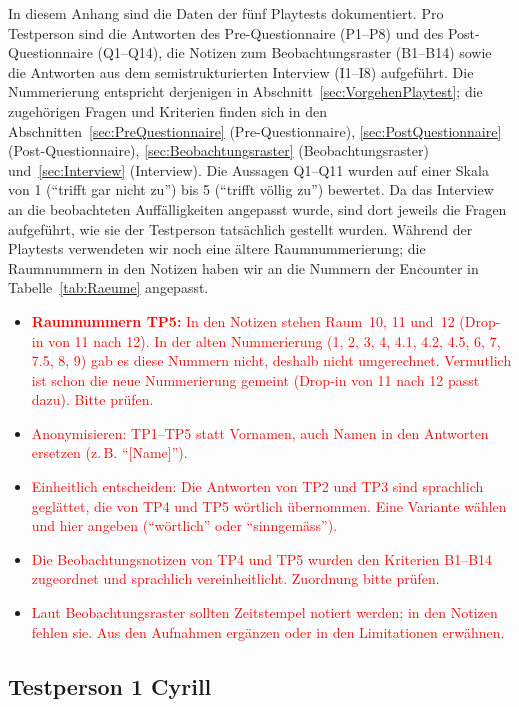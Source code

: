 \documentclass[../Main.tex]{subfiles}
\begin{document}
In diesem Anhang sind die Daten der fünf Playtests dokumentiert. Pro Testperson sind die Antworten des Pre-Questionnaire (P1--P8) und des Post-Questionnaire (Q1--Q14), die Notizen zum Beobachtungsraster (B1--B14) sowie die Antworten aus dem semistrukturierten Interview (I1--I8) aufgeführt. Die Nummerierung entspricht derjenigen in Abschnitt~\ref{sec:VorgehenPlaytest}; die zugehörigen Fragen und Kriterien finden sich in den Abschnitten~\ref{sec:PreQuestionnaire} (Pre-Questionnaire), \ref{sec:PostQuestionnaire} (Post-Questionnaire), \ref{sec:Beobachtungsraster} (Beobachtungsraster) und~\ref{sec:Interview} (Interview). Die Aussagen Q1--Q11 wurden auf einer Skala von 1 (\enquote{trifft gar nicht zu}) bis 5 (\enquote{trifft völlig zu}) bewertet. Da das Interview an die beobachteten Auffälligkeiten angepasst wurde, sind dort jeweils die Fragen aufgeführt, wie sie der Testperson tatsächlich gestellt wurden. Während der Playtests verwendeten wir noch eine ältere Raumnummerierung; die Raumnummern in den Notizen haben wir an die Nummern der Encounter in Tabelle~\ref{tab:Raeume} angepasst.

\begin{itemize}[leftmargin=1.5cm]
    \item \textcolor{red}{\textbf{Raumnummern TP5:} In den Notizen stehen Raum~10, 11 und~12 (Drop-in von 11 nach 12). In der alten Nummerierung (1, 2, 3, 4, 4.1, 4.2, 4.5, 6, 7, 7.5, 8, 9) gab es diese Nummern nicht, deshalb nicht umgerechnet. Vermutlich ist schon die neue Nummerierung gemeint (Drop-in von 11 nach 12 passt dazu). Bitte prüfen.}
    \item \textcolor{red}{Anonymisieren: TP1--TP5 statt Vornamen, auch Namen in den Antworten ersetzen (z.\,B. \enquote{[Name]}).}
    \item \textcolor{red}{Einheitlich entscheiden: Die Antworten von TP2 und TP3 sind sprachlich geglättet, die von TP4 und TP5 wörtlich übernommen. Eine Variante wählen und hier angeben (\enquote{wörtlich} oder \enquote{sinngemäss}).}
    \item \textcolor{red}{Die Beobachtungsnotizen von TP4 und TP5 wurden den Kriterien B1--B14 zugeordnet und sprachlich vereinheitlicht. Zuordnung bitte prüfen.}
    \item \textcolor{red}{Laut Beobachtungsraster sollten Zeitstempel notiert werden; in den Notizen fehlen sie. Aus den Aufnahmen ergänzen oder in den Limitationen erwähnen.}
\end{itemize}

\subsection{Testperson 1 Cyrill}
\end{document}
